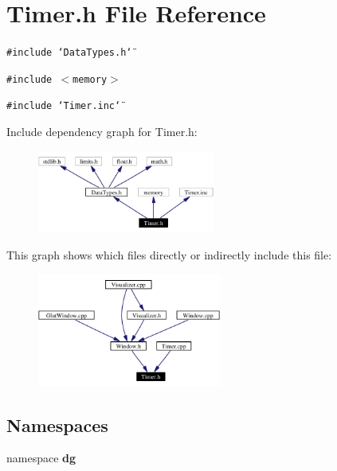 \section{Timer.h File Reference}
\label{Timer_8h}
{\tt \#include \char`\"{}Data\-Types.h\char`\"{}}\par
{\tt \#include $<$memory$>$}\par
{\tt \#include \char`\"{}Timer.inc\char`\"{}}\par


Include dependency graph for Timer.h:\begin{figure}[H]
\begin{center}
\leavevmode
\includegraphics[width=165pt]{Timer_8h__incl}
\end{center}
\end{figure}


This graph shows which files directly or indirectly include this file:\begin{figure}[H]
\begin{center}
\leavevmode
\includegraphics[width=171pt]{Timer_8h__dep__incl}
\end{center}
\end{figure}
\subsection*{Namespaces}
\begin{CompactItemize}
\item 
namespace {\bf dg}
\end{CompactItemize}
